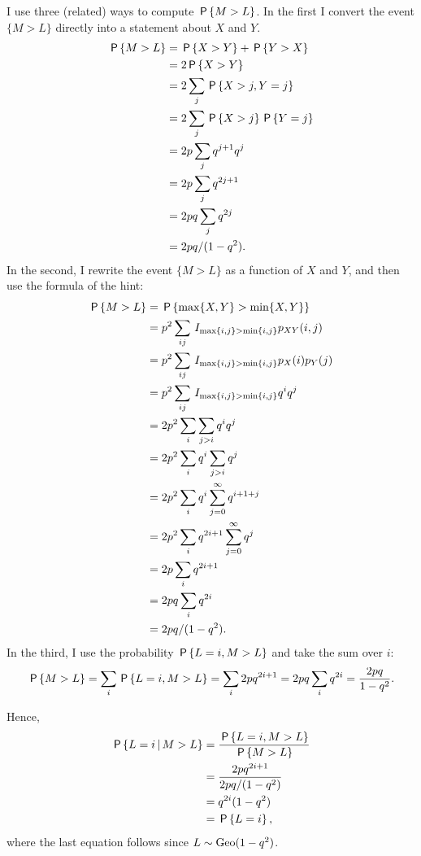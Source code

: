 \documentclass[a4paper,11pt]{article}
\begin{document}
\begin{exercise}
\begin{solution}
I use three (related) ways to compute $\P{M>L}$. In the first I convert the event $\{M>L\}$ directly into a statement about $X$ and $Y$.
\begin{align}
  \label{eq:3}
\P{M>L} 
&= \P{X>Y} + \P{Y > X} \\
&= 2\P{X>Y} \\
&= 2\sum_{j} \P{X>j,Y=j} \\
&= 2\sum_{j}  \P{X>j}\P{Y=j} \\
&= 2p\sum_{j} q^{j+1} q^j\\
&= 2p\sum_{j} q^{2j+1}\\
&= 2pq\sum_{j} q^{2j}\\
&= 2pq/(1-q^2).
\end{align}
In the second,  I rewrite the event $\{M>L\}$ as a function of $X$ and $Y$, and then use  the formula of the hint:
\begin{align}
  \label{eq:4}
\P{M>L}  &= \P{\max{X, Y} > \min{X,Y}} \\
&=p^2\sum_{ij}\1{\max{i, j} > \min{i, j}} p_{XY}(i,j) \\
&=p^2\sum_{ij}\1{\max{i, j} > \min{i, j}} p_{X}(i)p_{Y}(j) \\
&=p^2\sum_{ij}\1{\max{i, j} > \min{i, j}} q^i q^j \\
&=2p^2\sum_{i}\sum_{j>i} q^i q^j \\
&=2p^2\sum_{i}q^i \sum_{j>i} q^j \\
&=2p^2\sum_{i}q^i \sum_{j=0}^\infty q^{i+1+j} \\
&=2p^2\sum_{i}q^{2i+1} \sum_{j=0}^\infty q^{j} \\
&=2p\sum_{i}q^{2i+1} \\
&=2pq\sum_{i}q^{2i} \\
&=2pq/(1-q^2).
\end{align}
In the third, I use the probability $\P{L=i, M>L}$ and take the sum over $i$:
\begin{align}
  \label{eq:48}
\P{M>L} = \sum_{i} \P{L=i, M>L}  = \sum_{i} 2pq^{2i+1} = 2pq\sum_{i} q^{2i} = \frac{2pq}{1-q^{2}}.
\end{align}

Hence, 
\begin{align}
\P{L=i\given M > L} 
&=\frac{\P{L=i, M > L}}{\P{M>L}} \\
&=\frac{2p q^{2i+1}}{2pq/(1-q^2)} \\
&=q^{2i}(1-q^2) \\
&= \P{L=i},
\end{align}
where the last equation follows since $L\sim \Geo{1-q^2}$.

\end{solution}
\end{exercise}
\end{document}
